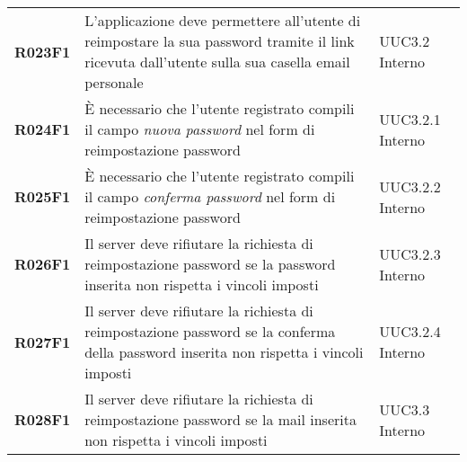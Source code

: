 \documentclass[../analisi-dei-requisiti.tex]{subfiles}
\begin{document}
\begin{longtable}[H]{>{\centering\bfseries}m{3cm} >{\centering}m{10cm} >{\centering\arraybackslash}m{3cm}}
  R023F1                               & L'applicazione deve permettere all'utente di reimpostare la sua password tramite il link ricevuta dall'utente sulla sua casella email personale                                                         & UUC3.2 Interno                \\
  R024F1                               & È necessario che l'utente registrato compili il campo \textit{nuova password} nel form di reimpostazione password                                                                                       & UUC3.2.1 Interno              \\
  R025F1                               & È necessario che l'utente registrato compili il campo \textit{conferma password} nel form di reimpostazione password                                                                                    & UUC3.2.2 Interno              \\
  R026F1                               & Il server deve rifiutare la richiesta di reimpostazione password se la password inserita non rispetta i vincoli imposti                                                                                 & UUC3.2.3 Interno              \\
  R027F1                               & Il server deve rifiutare la richiesta di reimpostazione password se la conferma della password inserita non rispetta i vincoli imposti                                                                  & UUC3.2.4 Interno              \\
  R028F1                               & Il server deve rifiutare la richiesta di reimpostazione password se la mail inserita non rispetta i vincoli imposti                                                                                     & UUC3.3 Interno                \\


\end{longtable}
\end{document}
